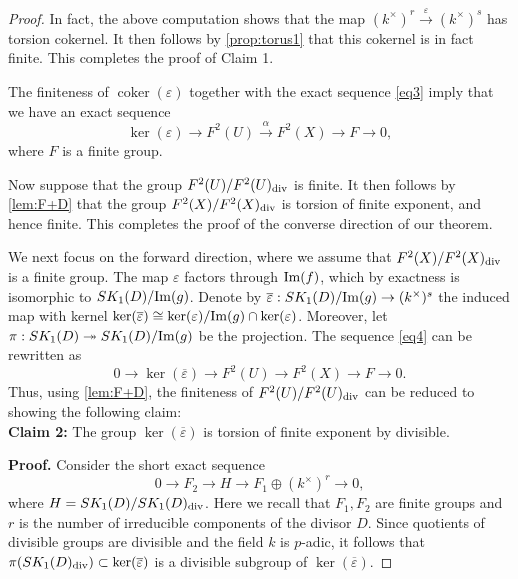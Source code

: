 \documentclass[12pt]{amsart}
\theoremstyle{remark}
\renewcommand{\1}{{\mathbb{S}}}
\newcommand{\<}{\langle}
\renewcommand{\>}{\rangle}
\newcommand{\cok}{{\operatorname{coker}}}
\newcommand{\img}{{\rm Im}}
\newcommand{\dv}{{\rm div}}
\begin{document}
\begin{proof}
In fact, the above computation shows that the map $(k^\times)^r\xrightarrow{\varepsilon} (k^\times)^s$ has torsion cokernel. It then follows by \autoref{prop:torus1} that this cokernel is in fact finite. This completes the proof of Claim 1.  

The finiteness of $\cok(\varepsilon)$ together with the exact sequence \eqref{eq3} imply that we have an exact sequence 
\begin{equation}\label{eq4}
    \ker(\varepsilon)\to F^2(U)\xrightarrow{\alpha} F^2(X)\to F\to 0,
\end{equation} where $F$ is a finite group. 


Now suppose that the group $F^2(U)/F^2(U)_{\dv}$ is finite. It then follows by \autoref{lem:F+D} that the group $F^2(X)/F^2(X)_{\dv}$ is torsion of finite exponent, and hence finite. This completes the proof of the converse direction of our theorem. 

We next focus on the forward direction, where we assume that $F^2(X)/F^2(X)_{\dv}$ is a finite group. The map $\varepsilon$ factors through $\img(f)$, which by exactness is isomorphic to $SK_1(D)/\img(g)$. Denote by $\overline{\varepsilon}:SK_1(D)/\img(g)\to (k^\times)^s$ the induced map with kernel $\ker(\overline{\varepsilon})\cong \ker(\varepsilon)/\img(g)\cap\ker(\varepsilon)$. Moreover, let $\pi:SK_1(D)\twoheadrightarrow SK_1(D)/\img(g)$ be the projection. The sequence \eqref{eq4} can be rewritten as 
\begin{equation}\label{eq5}
    0\to\ker(\overline{\varepsilon})\to F^2(U)\to F^2(X)\to F\to 0. 
\end{equation} Thus, using \autoref{lem:F+D}, the finiteness of $F^2(U)/F^2(U)_{\dv}$ can be reduced to showing the following claim: \\
\vspace{1mm}
\textbf{Claim 2:} The group $\ker(\overline{\varepsilon})$ is torsion  of finite exponent by divisible. 

\textbf{Proof.}
Consider the short exact sequence 
\[0\to F_2\to H\to F_1\oplus (k^\times)^r \to 0,\] where $H=SK_1(D)/SK_1(D)_{\dv}$.
Here we recall that $F_1, F_2$ are finite groups and $r$ is the number of irreducible components of the divisor $D$. 
Since quotients of divisible groups are divisible and the field $k$ is $p$-adic, it follows that $\pi(SK_1(D)_{\dv})\subset\ker(\overline{\varepsilon})$ is a divisible subgroup of $\ker(\overline{\varepsilon})$. 
 


\end{proof}
\end{document}
